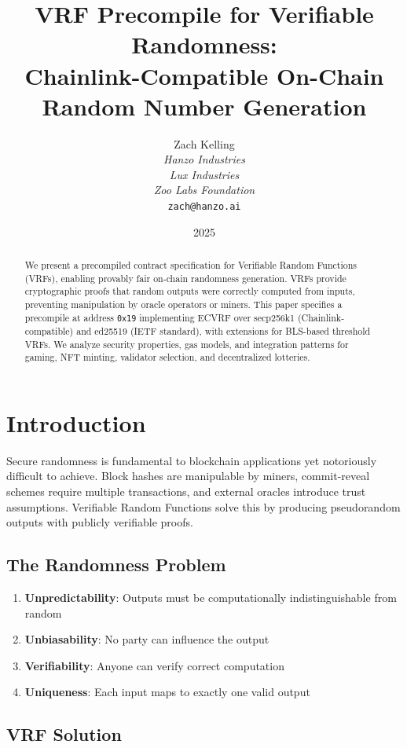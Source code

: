 \documentclass[11pt,a4paper]{article}
\title{VRF Precompile for Verifiable Randomness:\\Chainlink-Compatible On-Chain Random Number Generation}
\author{Zach Kelling\\
\textit{Hanzo Industries}\\
\textit{Lux Industries}\\
\textit{Zoo Labs Foundation}\\
\texttt{zach@hanzo.ai}}
\date{2025}
\theoremstyle{definition}
\begin{document}
\maketitle

\begin{abstract}
We present a precompiled contract specification for Verifiable Random Functions (VRFs), enabling provably fair on-chain randomness generation. VRFs provide cryptographic proofs that random outputs were correctly computed from inputs, preventing manipulation by oracle operators or miners. This paper specifies a precompile at address \texttt{0x19} implementing ECVRF over secp256k1 (Chainlink-compatible) and ed25519 (IETF standard), with extensions for BLS-based threshold VRFs. We analyze security properties, gas models, and integration patterns for gaming, NFT minting, validator selection, and decentralized lotteries.
\end{abstract}

\section{Introduction}

Secure randomness is fundamental to blockchain applications yet notoriously difficult to achieve. Block hashes are manipulable by miners, commit-reveal schemes require multiple transactions, and external oracles introduce trust assumptions. Verifiable Random Functions solve this by producing pseudorandom outputs with publicly verifiable proofs.

\subsection{The Randomness Problem}

\begin{enumerate}
    \item \textbf{Unpredictability}: Outputs must be computationally indistinguishable from random
    \item \textbf{Unbiasability}: No party can influence the output
    \item \textbf{Verifiability}: Anyone can verify correct computation
    \item \textbf{Uniqueness}: Each input maps to exactly one valid output
\end{enumerate}

\subsection{VRF Solution}
\end{document}
